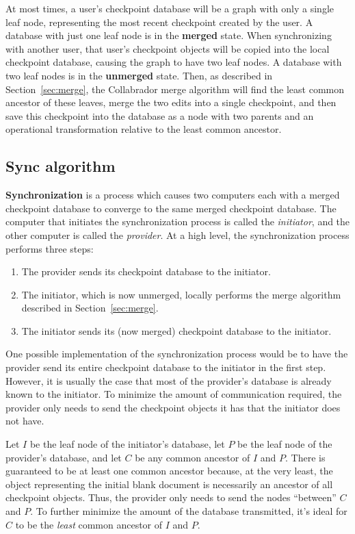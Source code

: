 \documentclass[11pt,titlepage]{article}
\begin{document}
At most times, a user's checkpoint database will be a graph with only
a single leaf node, representing the most recent checkpoint created by
the user. A database with just one leaf node is in the \textbf{merged}
state. When synchronizing with another user, that user's checkpoint
objects will be copied into the local checkpoint database, causing the
graph to have two leaf nodes. A database with two leaf nodes is in the
\textbf{unmerged} state. Then, as described in
Section~\ref{sec:merge}, the Collabrador merge algorithm will find the
least common ancestor of these leaves, merge the two edits into a
single checkpoint, and then save this checkpoint into the database as
a node with two parents and an operational transformation relative to
the least common ancestor.

\subsection{Sync algorithm}

\textbf{Synchronization} is a process which causes two computers each
with a merged checkpoint database to converge to the same merged
checkpoint database. The computer that initiates the synchronization
process is called the \emph{initiator}, and the other computer is
called the \emph{provider}. At a high level, the synchronization
process performs three steps:
\begin{enumerate}
\item The provider sends its checkpoint database to the initiator.
\item The initiator, which is now unmerged, locally performs the merge
  algorithm described in Section~\ref{sec:merge}.
\item The initiator sends its (now merged) checkpoint database to the
  initiator.
\end{enumerate}
One possible implementation of the synchronization process would be to
have the provider send its entire checkpoint database to the initiator
in the first step. However, it is usually the case that most of the
provider's database is already known to the initiator. To minimize the
amount of communication required, the provider only needs to send the
checkpoint objects it has that the initiator does not have.

Let $I$ be the leaf node of the initiator's database, let $P$ be the
leaf node of the provider's database, and let $C$ be any common
ancestor of $I$ and $P$. There is guaranteed to be at least one common
ancestor because, at the very least, the object representing the
initial blank document is necessarily an ancestor of all checkpoint
objects. Thus, the provider only needs to send the nodes ``between''
$C$ and $P$. To further minimize the amount of the database
transmitted, it's ideal for $C$ to be the \emph{least} common ancestor
of $I$ and $P$.
\end{document}
